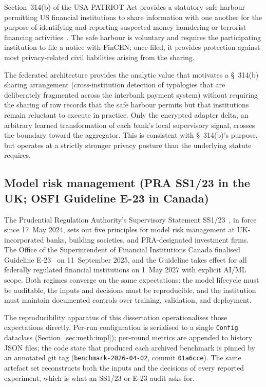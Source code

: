 \documentclass{report}
\begin{document}
Section~314(b) of the USA PATRIOT Act provides a statutory safe harbour permitting US financial institutions to share information with one another for the purpose of identifying and reporting suspected money laundering or terrorist financing activities~\cite{fincen314b}. The safe harbour is voluntary and requires the participating institution to file a notice with FinCEN; once filed, it provides protection against most privacy-related civil liabilities arising from the sharing.

The federated architecture provides the analytic value that motivates a \S~314(b) sharing arrangement (cross-institution detection of typologies that are deliberately fragmented across the interbank payment system) without requiring the sharing of raw records that the safe harbour permits but that institutions remain reluctant to execute in practice. Only the encrypted adapter delta, an arbitrary learned transformation of each bank's local supervisory signal, crosses the boundary toward the aggregator. This is consistent with \S~314(b)'s purpose, but operates at a strictly stronger privacy posture than the underlying statute requires.

\subsection{Model risk management (PRA SS1/23 in the UK; OSFI Guideline E-23 in Canada)}

The Prudential Regulation Authority's Supervisory Statement SS1/23~\cite{prass123}, in force since 17~May 2024, sets out five principles for model risk management at UK-incorporated banks, building societies, and PRA-designated investment firms. The Office of the Superintendent of Financial Institutions Canada finalised Guideline E-23~\cite{osfie23} on 11~September 2025, and the Guideline takes effect for all federally regulated financial institutions on 1~May 2027 with explicit AI/ML scope. Both regimes converge on the same expectations: the model lifecycle must be auditable, the inputs and decisions must be reproducible, and the institution must maintain documented controls over training, validation, and deployment.

The reproducibility apparatus of this dissertation operationalises those expectations directly. Per-run configuration is serialised to a single \texttt{Config} dataclass (Section~\ref{sec:meth:impl}); per-round metrics are appended to history JSON files; the code state that produced each archived benchmark is pinned by an annotated git tag (\texttt{benchmark-2026-04-02}, commit \texttt{01a6cce}). The same artefact set reconstructs both the inputs and the decisions of every reported experiment, which is what an SS1/23 or E-23 audit asks for.
\end{document}
